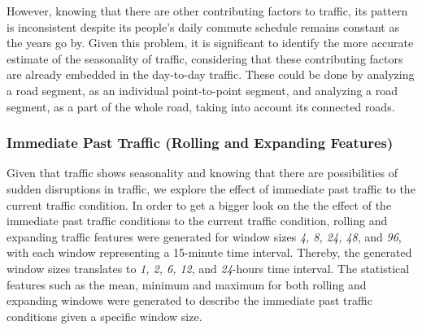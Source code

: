 However, knowing that there are other contributing factors to traffic, its pattern is inconsistent despite its people’s daily commute schedule remains constant as the years go by. Given this problem, it is significant to identify the more accurate estimate of the seasonality of traffic, considering that these contributing factors are already embedded in the day-to-day traffic. These could be done by analyzing a road segment, as an individual point-to-point segment, and analyzing a road segment, as a part of the whole road, taking into account its connected roads. 


\subsubsection{Immediate Past Traffic (Rolling and Expanding Features)}
Given that traffic shows seasonality and knowing that there are possibilities of sudden disruptions in traffic, we explore the effect of immediate past traffic to the current traffic condition. In order to get a bigger look on the the effect of the immediate past traffic conditions to the current traffic condition, rolling and expanding traffic features were generated for window sizes \textit{4, 8,  24, 48}, and \textit{96}, with each window representing a 15-minute time interval. Thereby, the generated window sizes translates to \textit{1, 2, 6, 12}, and \textit{24}-hours time interval. The statistical features such as the mean, minimum and maximum for both rolling and expanding windows were generated to describe the immediate past traffic conditions given a specific window size.

